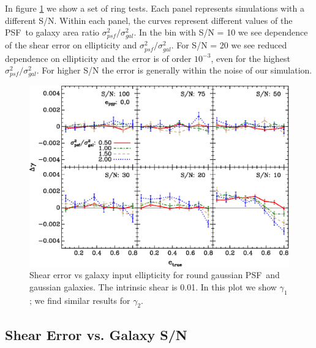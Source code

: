 \documentclass[10pt,preprint]{aastex}
\newcommand{\aratio}{\ensuremath{\sigma^2_{psf}/\sigma^2_{gal}}}
\newcommand{\psf}{PSF}
\newcommand{\Rshear}{\ensuremath{\mathcal{R}}}
\newcommand{\rfracerr}{\ensuremath{\Delta \Rshear/\Rshear}}
\begin{document}
In figure \ref{fig:set-e-gg01} we show a set of ring tests.  Each panel
represents simulations with a different S/N.  Within each panel, the curves
represent different values of the \psf\ to galaxy area ratio \aratio.  In the bin
with S/N = 10 we see dependence of the shear error on ellipticity and \aratio.  For
S/N = 20 we see reduced dependence on ellipticity and the error is of
order $10^{-3}$, even for the highest \aratio.  For higher S/N the error is
generally within the noise of our simulation.

\begin{figure}[t] \centering
 \centering 
 \includegraphics[scale=1]{figures/set-e-gg01-yr-0.005-0.005-vs-e.eps}

 \caption{Shear error vs galaxy input ellipticity for round gaussian \psf\ and
 gaussian galaxies. The intrinsic shear is 0.01.  In this plot we show
 $\gamma_1$; we find similar results for $\gamma_2$.  \label{fig:set-e-gg01}}

\end{figure}



\subsection{Shear Error vs. Galaxy S/N}
\end{document}
